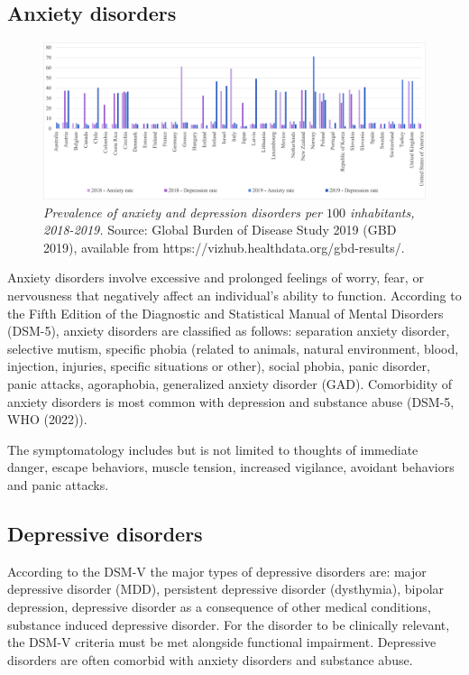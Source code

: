         \subsection{Anxiety disorders}

            \begin{figure}  %
                \centering
                \includegraphics[width=\textwidth]{GRAPHS/anxiety_depression_100_rate_2018_2019.png}
                \caption{\emph{Prevalence of anxiety and depression disorders per $100$ inhabitants, 2018-2019.}
                {\scriptsize Source: Global Burden of Disease Study 2019 (GBD 2019), available from https://vizhub.healthdata.org/gbd-results/.}}
                \label{fig:anxiety_OECD}
            \end{figure}
            
            Anxiety disorders involve excessive and prolonged feelings of worry, fear, or nervousness that negatively affect an individual's ability to function. According to the Fifth Edition of the Diagnostic and Statistical Manual of Mental Disorders (DSM-5), anxiety disorders are classified as follows: separation anxiety disorder, selective mutism, specific phobia (related to animals, natural environment, blood, injection, injuries, specific situations or other), social phobia, panic disorder, panic attacks, agoraphobia, generalized anxiety disorder (GAD). Comorbidity of anxiety disorders is most common with depression and substance abuse (DSM-5, WHO (2022)).

            The symptomatology includes but is not limited to thoughts of immediate danger, escape behaviors, muscle tension, increased vigilance, avoidant behaviors and panic attacks. 


        \subsection{Depressive disorders}
            According to the DSM-V the major types of depressive disorders are: major depressive disorder (MDD), persistent depressive disorder (dysthymia), bipolar depression, depressive disorder as a consequence of other medical conditions, substance induced depressive disorder. For the disorder to be clinically relevant, the DSM-V criteria must be met alongside functional impairment.
            Depressive disorders are often comorbid with anxiety disorders and substance abuse. 

